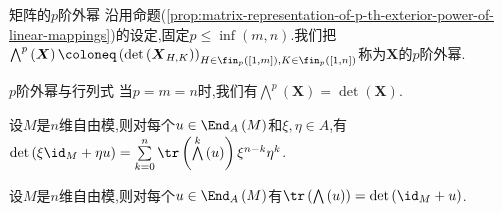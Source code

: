 \begin{definition}{矩阵的$p$阶外幂}{}
	沿用命题(\cref{prop:matrix-representation-of-p-th-exterior-power-of-linear-mappings})的设定,固定$p\leq\inf\left(m,n\right)$.我们把$\bigwedge^{p}\left(\boldsymbol{X}\right)\coloneq\left(\det\left(\boldsymbol{X}_{H,K}\right)\right)_{H\in\fin_{p}\left(\left[1,m\right]\right),K\in\fin_{p}\left(\left[1,n\right]\right)}$称为$\boldsymbol{X}$的$p$阶外幂.
\end{definition}

\begin{remark}{$p$阶外幂与行列式}{}
	当$p=m=n$时,我们有$\bigwedge\limits^{p}\left(\boldsymbol{X}\right)=\det\left(\boldsymbol{X}\right)$.
\end{remark}

\begin{proposition}{}{}
	设$M$是$n$维自由模,则对每个$u\in\End_{A}\left(M\right)$和$\xi,\eta\in A$,有$\det\left(\xi\id_{M}+\eta u\right)=\sum\limits_{k=0}^{n}\tr\left(\bigwedge\limits^{k}\left(u\right)\right)\xi^{n-k}\eta^{k}$.
\end{proposition}

\begin{corollary}{}{}
	设$M$是$n$维自由模,则对每个$u\in\End_{A}\left(M\right)$有$\tr\left(\bigwedge\left(u\right)\right)=\det\left(\id_{M}+u\right)$.
\end{corollary}
































































































